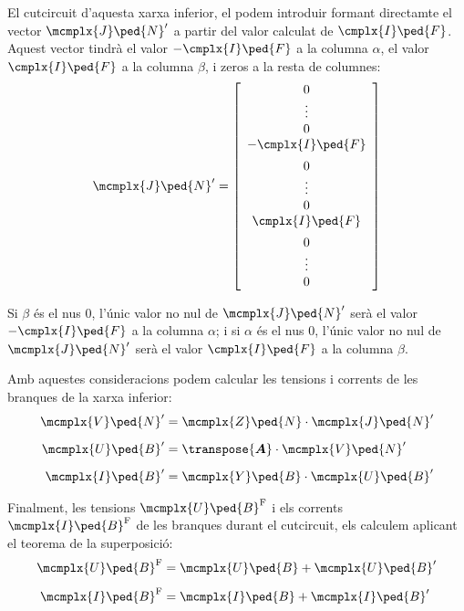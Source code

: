 El cutcircuit d'aquesta xarxa inferior, el podem introduir formant directamte el vector $\mcmplx{J}\ped{N}'$ a partir del valor calculat de $\cmplx{I}\ped{F}$. Aquest vector tindrà el valor $-\cmplx{I}\ped{F}$ a la columna $\alpha$, el valor $\cmplx{I}\ped{F}$ a la columna $\beta$, i zeros a la resta de columnes:
\begin{equation}
	\mcmplx{J}\ped{N}' =
	\begin{bmatrix}\begin{array}{c}
			0 \\
			\vdots{} \\
            0 \\
            -\cmplx{I}\ped{F} \\[0.5em]
            0 \\
            \vdots{} \\
            0 \\
            \cmplx{I}\ped{F} \\[0.5em]
            0 \\
            \vdots{} \\
			0
	\end{array}\end{bmatrix}
\end{equation}

Si $\beta$ és el nus 0, l'únic valor no nul de $\mcmplx{J}\ped{N}'$ serà el valor $-\cmplx{I}\ped{F}$ a la columna $\alpha$; i si $\alpha$ és el nus 0, l'únic valor no nul de $\mcmplx{J}\ped{N}'$ serà el valor $\cmplx{I}\ped{F}$ a la columna $\beta$.

Amb aquestes consideracions podem calcular les tensions i corrents de les branques de la xarxa inferior:
\begin{subequations}
\begin{align}
   \mcmplx{V}\ped{N}' &= \mcmplx{Z}\ped{N} \cdot \mcmplx{J}\ped{N}' \\[0.5em]
   \mcmplx{U}\ped{B}' &=  \transpose{\boldsymbol{A}} \cdot \mcmplx{V}\ped{N}' \\[0.5em]
   \mcmplx{I}\ped{B}' &= \mcmplx{Y}\ped{B} \cdot \mcmplx{U}\ped{B}'
\end{align}
\end{subequations}

Finalment, les  tensions $\mcmplx{U}\ped{B}^{\text{F}}$ i els corrents $\mcmplx{I}\ped{B}^{\text{F}}$ de les branques durant el cutcircuit, els calculem aplicant el teorema de la superposició:
\begin{align}
   \mcmplx{U}\ped{B}^{\text{F}} &=  \mcmplx{U}\ped{B} + \mcmplx{U}\ped{B}' \\[0.5em]
   \mcmplx{I}\ped{B}^{\text{F}} &=  \mcmplx{I}\ped{B} + \mcmplx{I}\ped{B}'
\end{align}

